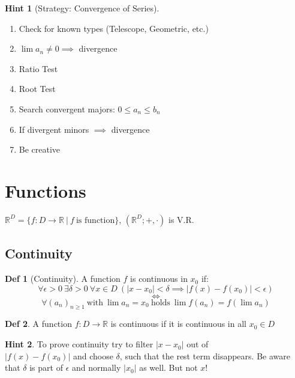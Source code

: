 \documentclass[a4paper, 10pt]{article}
\theoremstyle{definition}
\newtheorem*{definition}{Def}
\newtheorem*{note_wrapper}{Hint}
\theoremstyle{named}
\newenvironment{note}%
    {\begin{mdframed}[style=trick]\begin{note_wrapper}}%
    {\end{note_wrapper}\end{mdframed}}
\newcommand{\R}{\mathbb{R}}
\begin{document}
\begin{note}[Strategy: Convergence of Series]
    $\,$
    \begin{enumerate}
        \item Check for known types (Telescope, Geometric, etc.)
        \item $\lim a_n \neq 0 \implies$ divergence
        \item Ratio Test
        \item Root Test
        \item Search convergent majors: $0 \leq a_n \leq b_n$
        \item If divergent minors $\implies$ divergence
        \item Be creative
    \end{enumerate}
\end{note}

\section{Functions}
$\R^D = \{f: D \to \R \ | \ f \ \text{is function} \}$, $(\R^D; +, \cdot)$ is V.R.
\subsection{Continuity}
\begin{definition}[Continuity]
    A function $f$ is continuous in $x_0$ if:
    $$\forall \epsilon > 0 \ \exists \delta > 0 \ \forall x \in D \ (|x - x_0| < \delta \implies |f(x) - f(x_0)| < \epsilon)$$
    $$\iff$$
    $$\forall (a_n)_{n \geq 1} \ \text{with} \ \lim a_n = x_0 \ \text{holds} \ \lim f(a_n) = f(\lim a_n)$$
\end{definition}

\begin{definition}
    A function $f: D \to \R$ is continuous if it is continuous in all $x_0 \in D$
\end{definition}

\begin{note}
    To prove continuity try to filter $|x - x_0|$ out of \\
    $|f(x) - f(x_0)|$ and choose $\delta$, such that the rest term disappears. Be aware that $\delta$ is part of $\epsilon$ and normally $|x_0|$ as well. But not $x$!
\end{note}
\end{document}
